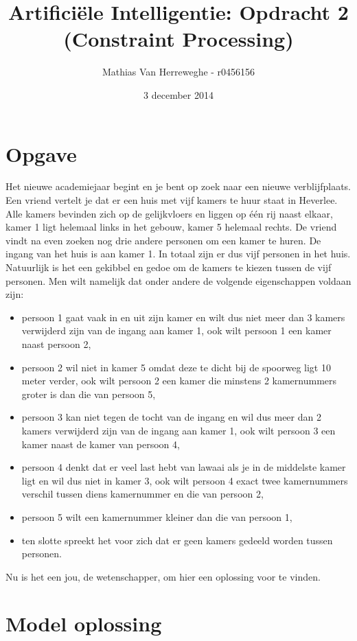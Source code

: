 \documentclass{article}
\title{Artificiële Intelligentie: Opdracht 2 (Constraint Processing)}
\author{Mathias Van Herreweghe - r0456156}
\date{3 december 2014}
\begin{document}
\maketitle
\newpage

\section{Opgave}
Het nieuwe academiejaar begint en je bent op zoek naar een nieuwe verblijfplaats. Een vriend vertelt je dat er een huis met vijf kamers te huur staat in Heverlee. Alle kamers bevinden zich op de gelijkvloers en liggen op één rij naast elkaar, kamer 1 ligt helemaal links in het gebouw, kamer 5 helemaal rechts. De vriend vindt na even zoeken nog drie andere personen om een kamer te huren. De ingang van het huis is aan kamer 1. In totaal zijn er dus vijf personen in het huis. Natuurlijk is het een gekibbel en gedoe om de kamers te kiezen tussen de vijf personen. Men wilt namelijk dat onder andere de volgende eigenschappen voldaan zijn:


\begin{itemize}
\item persoon 1 gaat vaak in en uit zijn kamer en wilt dus niet meer dan 3 kamers verwijderd zijn van de ingang aan kamer 1, ook wilt persoon 1 een kamer naast persoon 2,
\item persoon 2 wil niet in kamer 5 omdat deze te dicht bij de spoorweg ligt 10 meter verder, ook wilt persoon 2 een kamer die minstens 2 kamernummers groter is dan die van persoon 5,
\item persoon 3 kan niet tegen de tocht van de ingang en wil dus meer dan 2 kamers verwijderd zijn van de ingang aan kamer 1, ook wilt persoon 3 een kamer naast de kamer van persoon 4,
\item persoon 4 denkt dat er veel last hebt van lawaai als je in de middelste kamer ligt en wil dus niet in kamer 3, ook wilt persoon 4 exact twee kamernummers verschil tussen diens kamernummer en die van persoon 2,
\item persoon 5 wilt een kamernummer kleiner dan die van persoon 1,
\item ten slotte spreekt het voor zich dat er geen kamers gedeeld worden tussen personen.
\end{itemize}

Nu is het een jou, de wetenschapper, om hier een oplossing voor te vinden.

\newpage
\section{Model oplossing}
\end{document}
